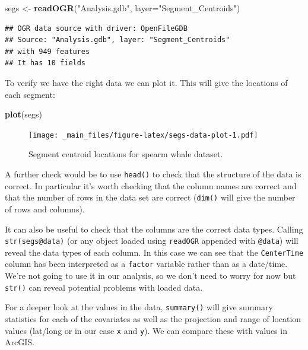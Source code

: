 \documentclass[]{book}
\newenvironment{Shaded}{\begin{snugshade}}{\end{snugshade}}
\newcommand{\KeywordTok}[1]{\textcolor[rgb]{0.13,0.29,0.53}{\textbf{#1}}}
\newcommand{\DataTypeTok}[1]{\textcolor[rgb]{0.13,0.29,0.53}{#1}}
\newcommand{\StringTok}[1]{\textcolor[rgb]{0.31,0.60,0.02}{#1}}
\newcommand{\NormalTok}[1]{#1}
\theoremstyle{definition}
\theoremstyle{definition}
\theoremstyle{remark}
\begin{document}
\begin{Shaded}
\begin{Highlighting}[]
\NormalTok{segs <-}\StringTok{ }\KeywordTok{readOGR}\NormalTok{(}\StringTok{"Analysis.gdb"}\NormalTok{, }\DataTypeTok{layer=}\StringTok{"Segment_Centroids"}\NormalTok{)}
\end{Highlighting}
\end{Shaded}

\begin{verbatim}
## OGR data source with driver: OpenFileGDB 
## Source: "Analysis.gdb", layer: "Segment_Centroids"
## with 949 features
## It has 10 fields
\end{verbatim}

To verify we have the right data we can plot it. This will give the
locations of each segment:

\begin{Shaded}
\begin{Highlighting}[]
\KeywordTok{plot}\NormalTok{(segs)}
\end{Highlighting}
\end{Shaded}

\begin{figure}
\centering
\texttt{[image: \_main\_files/figure-latex/segs-data-plot-1.pdf]}
\caption{\label{fig:segs-data-plot}Segment centroid locations for spearm
whale dataset.}
\end{figure}

A further check would be to use \texttt{head()} to check that the
structure of the data is correct. In particular it's worth checking that
the column names are correct and that the number of rows in the data set
are correct (\texttt{dim()} will give the number of rows and columns).

It can also be useful to check that the columns are the correct data
types. Calling \texttt{str(segs@data)} (or any object loaded using
\texttt{readOGR} appended with \texttt{@data}) will reveal the data
types of each column. In this case we can see that the
\texttt{CenterTime} column has been interpreted as a \texttt{factor}
variable rather than as a date/time. We're not going to use it in our
analysis, so we don't need to worry for now but \texttt{str()} can
reveal potential problems with loaded data.

For a deeper look at the values in the data, \texttt{summary()} will
give summary statistics for each of the covariates as well as the
projection and range of location values (lat/long or in our case
\texttt{x} and \texttt{y}). We can compare these with values in ArcGIS.
\end{document}

